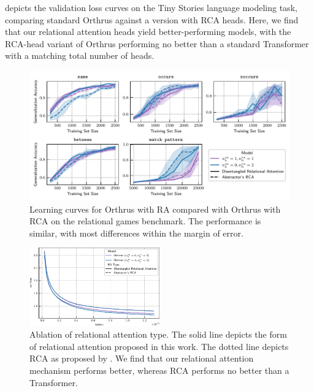  depicts the validation loss curves on the Tiny Stories language modeling task, comparing standard Orthrus against a version with RCA heads. Here, we find that our relational attention heads yield better-performing models, with the RCA-head variant of Orthrus performing no better than a standard Transformer with a matching total number of heads.

\begin{figure}[ht]
    \includegraphics[width=\textwidth]{figs/experiments/relgames/relgames_learning_curves_rcatype_ablation.pdf}
    \caption{Learning curves for Orthrus with RA compared with Orthrus with RCA on the relational games benchmark. The performance is similar, with most differences within the margin of error.}\label{fig:relgames_ratype_ablation}
\end{figure}

\begin{figure}[ht]
    \centering
    \includegraphics[width=0.5\textwidth]{figs/experiments/tiny_stories/d64L4_ra_type_ablation_symattn_asymra.pdf}
    \caption{Ablation of relational attention type. The solid line depicts the form of relational attention proposed in this work. The dotted line depicts RCA as proposed by \citet{altabaa2024abstractors}. We find that our relational attention mechanism performs better, whereas RCA performs no better than a Transformer.}\label{fig:tinystories_ratype_ablation}
\end{figure}